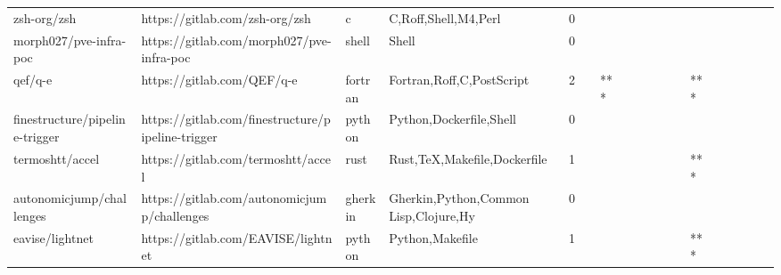 \begin{tabular}{llllrlllllllllllll}
zsh-org/zsh                                        &                     https://gitlab.com/zsh-org/zsh &                 c &                               C,Roff,Shell,M4,Perl &       0 &         &        &           &                &                 &        &           &           &          &          &       &              &          \\
morph027/pve-infra-poc                             &          https://gitlab.com/morph027/pve-infra-poc &             shell &                                              Shell &       0 &         &        &           &                &                 &        &           &           &          &          &       &              &          \\
qef/q-e                                            &                         https://gitlab.com/QEF/q-e &           fortran &                          Fortran,Roff,C,PostScript &       2 &         &    *** &           &                &                 &        &           &       *** &          &          &       &              &          \\
finestructure/pipeline-trigger                     &  https://gitlab.com/finestructure/pipeline-trigger &            python &                            Python,Dockerfile,Shell &       0 &         &        &           &                &                 &        &           &           &          &          &       &              &          \\
termoshtt/accel                                    &                 https://gitlab.com/termoshtt/accel &              rust &                       Rust,TeX,Makefile,Dockerfile &       1 &         &        &           &                &                 &        &           &       *** &          &          &       &              &          \\
autonomicjump/challenges                           &        https://gitlab.com/autonomicjump/challenges &           gherkin &              Gherkin,Python,Common Lisp,Clojure,Hy &       0 &         &        &           &                &                 &        &           &           &          &          &       &              &          \\
eavise/lightnet                                    &                 https://gitlab.com/EAVISE/lightnet &            python &                                    Python,Makefile &       1 &         &        &           &                &                 &        &           &       *** &          &          &       &              &          \\

\end{tabular}

